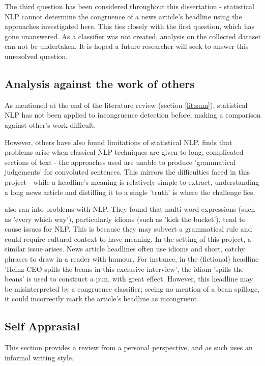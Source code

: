 The third question has been considered throughout this dissertation - statistical NLP cannot determine the congruence of a news article's headline using the approaches investigated here. This ties closely with the first question, which has gone unanswered. As a classifier was not created, analysis on the collected dataset can not be undertaken. It is hoped a future researcher will seek to answer this unresolved question.

\subsection{Analysis against the work of others}

As mentioned at the end of the literature review (section \ref{lit:sum}), statistical NLP has not been applied to incongruence detection before, making a comparison against other's work difficult.

However, others have also found limitations of statistical NLP. \citeauthor{manning1999} finds that problems arise when classical NLP techniques are given to long, complicated sections of text - the approaches used are unable to produce 'grammatical judgements' for convoluted sentences. This mirrors the difficulties faced in this project - while a headline's meaning is relatively simple to extract, understanding a long news article and distilling it to a single 'truth' is where the challenge lies.

\citeauthor{sag2002} also ran into problems with NLP. They found that multi-word expressions (such as 'every which way'), particularly idioms (such as 'kick the bucket'), tend to cause issues for NLP. This is because they may subvert a grammatical rule and could require cultural context to have meaning. In the setting of this project, a similar issue arises. News article headlines often use idioms and short, catchy phrases to draw in a reader with humour. For instance, in the (fictional) headline 'Heinz CEO spills the beans in this exclusive interview', the idiom 'spills the beans' is used to construct a pun, with great effect. However, this headline may be misinterpreted by a congruence classifier; seeing no mention of a bean spillage, it could incorrectly mark the article's headline as incongruent.

\subsection{Self Apprasial}

This section provides a review from a personal perspective, and as such uses an informal writing style.

